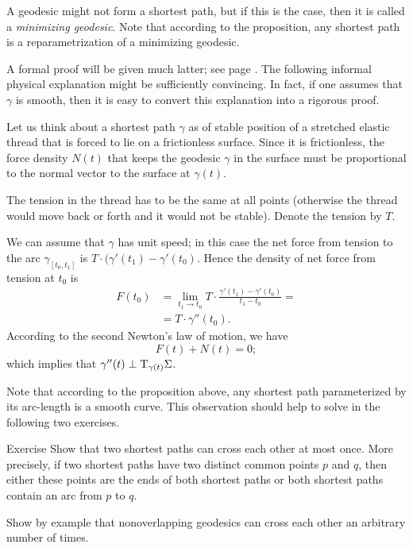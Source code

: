 A geodesic might not form a shortest path, but if this is the case, then it is called a \emph{minimizing geodesic}.
Note that according to the proposition, any shortest path is a reparametrization of a minimizing geodesic.

A formal proof will be given much latter; see page \pageref{page:proof-of-gamma''}. 
The following informal physical explanation might be sufficiently convincing.
In fact, if one assumes that $\gamma$ is smooth, then it is easy to convert this explanation into a rigorous proof.

Let us think about a shortest path $\gamma$ as of stable position of a stretched elastic thread that is forced to lie on a frictionless surface.
Since it is frictionless, the force density $N(t)$ that keeps the geodesic $\gamma$ in the surface must be proportional to the normal vector to the surface at $\gamma(t)$.

The tension in the thread has to be the same at all points (otherwise the thread would move back or forth and it would not be stable).
Denote  the tension by $T$.

We can assume that $\gamma$ has unit speed;
in this case the net force from tension to the arc $\gamma_{[t_0,t_1]}$ is $T\cdot(\gamma'(t_1)-\gamma'(t_0)$.
Hence the density of net force from tension at $t_0$ is 
\begin{align*}
F(t_0)&=\lim_{t_1\to t_0}T\cdot\frac{\gamma'(t_1)-\gamma'(t_0)}{t_1-t_0}=
\\
&=T\cdot\gamma''(t_0).
\end{align*}
According to the second Newton's law of motion, we have 
\[F(t)+N(t)=0;\]
which implies that  $\gamma''(t)\perp\mathrm{T}_{\gamma(t)}\Sigma$.
\qeds

Note that according to the proposition above, any shortest path parameterized by its arc-length is a smooth curve.
This observation should help to solve in the following two exercises.

\begin{thm}{Exercise}\label{ex:two-min-geod}
Show that two shortest paths can cross each other at most once.
More precisely, if two shortest paths have two distinct common points $p$ and $q$, then either these points are the ends of both shortest paths or both shortest paths contain an arc from $p$ to $q$.

Show by example that nonoverlapping geodesics can cross each other an arbitrary number of times.
\end{thm}

